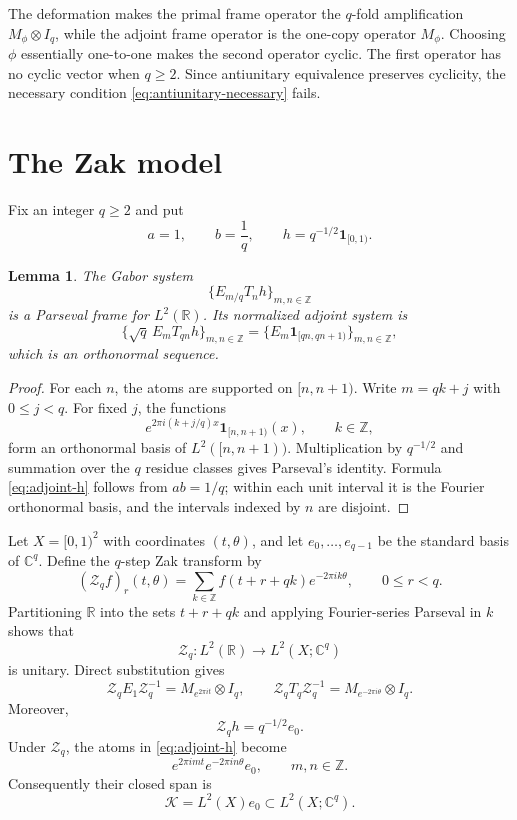 \documentclass[11pt]{article}
\newtheorem{lemma}{Lemma}
\newcommand{\R}{\mathbb R}
\newcommand{\C}{\mathbb C}
\newcommand{\Z}{\mathbb Z}
\newcommand{\cK}{\mathcal K}
\newcommand{\Zak}{\mathcal Z_q}
\newcommand{\one}{\mathbf 1}
\begin{document}
The deformation makes the primal frame operator the $q$-fold amplification
$M_\phi\otimes I_q$, while the adjoint frame operator is the one-copy
operator $M_\phi$.  Choosing $\phi$ essentially one-to-one makes the second
operator cyclic.  The first operator has no cyclic vector when $q\ge2$.
Since antiunitary equivalence preserves cyclicity, the necessary condition
\eqref{eq:antiunitary-necessary} fails.

\section{The Zak model}

Fix an integer $q\ge2$ and put
\[
 a=1,\qquad b=\frac1q,\qquad
 h=q^{-1/2}\one_{[0,1)}.
\]

\begin{lemma}\label{lem:base-systems}
The Gabor system
\[
 \{E_{m/q}T_nh\}_{m,n\in\Z}
\]
is a Parseval frame for $L^2(\R)$.  Its normalized adjoint system is
\begin{equation}\label{eq:adjoint-h}
 \{\sqrt q\,E_mT_{qn}h\}_{m,n\in\Z}
 =\{E_m\one_{[qn,qn+1)}\}_{m,n\in\Z},
\end{equation}
which is an orthonormal sequence.
\end{lemma}

\begin{proof}
For each $n$, the atoms are supported on $[n,n+1)$.  Write $m=qk+j$ with
$0\le j<q$.  For fixed $j$, the functions
\[
 e^{2\pi i(k+j/q)x}\one_{[n,n+1)}(x),\qquad k\in\Z,
\]
form an orthonormal basis of $L^2([n,n+1))$.  Multiplication by
$q^{-1/2}$ and summation over the $q$ residue classes gives Parseval's
identity.  Formula \eqref{eq:adjoint-h} follows from $ab=1/q$; within each
unit interval it is the Fourier orthonormal basis, and the intervals indexed
by $n$ are disjoint.
\end{proof}

Let $X=[0,1)^2$ with coordinates $(t,\theta)$, and let
$e_0,\ldots,e_{q-1}$ be the standard basis of $\C^q$.  Define the $q$-step
Zak transform by
\begin{equation}\label{eq:zak}
 (\Zak f)_r(t,\theta)
 =\sum_{k\in\Z}f(t+r+qk)e^{-2\pi ik\theta},
 \qquad 0\le r<q.
\end{equation}
Partitioning $\R$ into the sets $t+r+qk$ and applying Fourier-series
Parseval in $k$ shows that
\[
 \Zak:L^2(\R)\longrightarrow L^2(X;\C^q)
\]
is unitary.  Direct substitution gives
\begin{equation}\label{eq:zak-shifts}
 \Zak E_1\Zak^{-1}=M_{e^{2\pi it}}\otimes I_q,
 \qquad
 \Zak T_q\Zak^{-1}=M_{e^{-2\pi i\theta}}\otimes I_q.
\end{equation}
Moreover,
\begin{equation}\label{eq:zak-h}
 \Zak h=q^{-1/2}e_0.
\end{equation}
Under $\Zak$, the atoms in \eqref{eq:adjoint-h} become
\[
 e^{2\pi imt}e^{-2\pi in\theta}e_0,
 \qquad m,n\in\Z.
\]
Consequently their closed span is
\begin{equation}\label{eq:K}
 \cK=L^2(X)e_0\subset L^2(X;\C^q).
\end{equation}
\end{document}
